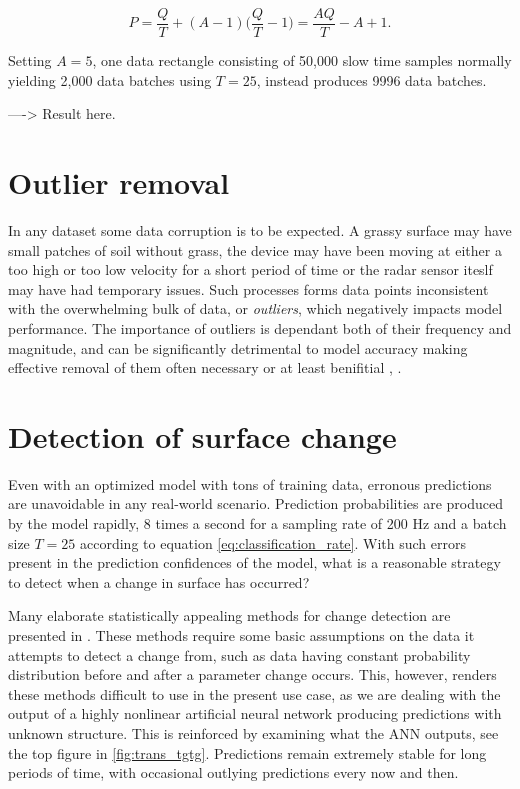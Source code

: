 \begin{equation}
	P = 
	\frac{Q}{T} + (A-1)\Big(\frac{Q}{T} - 1\Big) = 
	\frac{AQ}{T}-A+1.
\end{equation}


Setting $A=5$, one data rectangle consisting of 50,000 slow time samples normally yielding 2,000 data batches using $T=25$, instead produces 9996 data batches.  

----> Result here.

\section{Outlier removal}

In any dataset some data corruption is to be expected. A grassy surface may have small patches of soil without grass, the device may have been moving at either a too high or too low velocity for a short period of time or the radar sensor iteslf may have had temporary issues. Such processes forms data points inconsistent with the overwhelming bulk of data, or \emph{outliers}, which negatively impacts model performance. The importance of outliers is dependant both of their frequency and magnitude, and can be significantly detrimental to model accuracy making effective removal of them often necessary or at least benifitial \citep{osborne_overbay_2004}, \citep{hodge_austin_2004}. 

\section{Detection of surface change}

Even with an optimized model with tons of training data, erronous predictions are unavoidable in any real-world scenario. Prediction probabilities are produced by the model rapidly, 8 times a second for a sampling rate of 200 Hz and a batch size $T=25$ according to equation \ref{eq:classification_rate}. With such errors present in the prediction confidences of the model, what is a reasonable strategy to detect when a change in surface has occurred?  




Many elaborate statistically appealing methods for change detection are presented in \citep{basseville_nikiforov_1993}. These methods require some basic assumptions on the data it attempts to detect a change from, such as data having constant probability distribution before and after a parameter change occurs. This, however, renders these methods difficult to use in the present use case, as we are dealing with the output of a highly nonlinear artificial neural network producing predictions with unknown structure. This is reinforced by examining what the ANN outputs, see the top figure in \ref{fig:trans_tgtg}. Predictions remain extremely stable for long periods of time, with occasional outlying predictions every now and then. 



